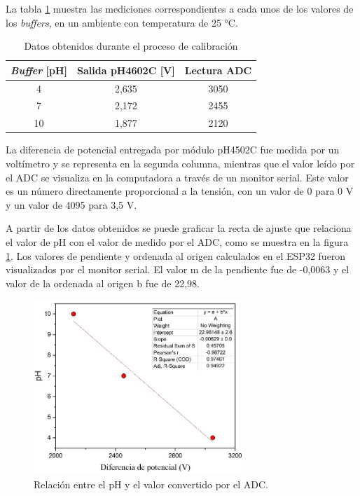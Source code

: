 La tabla \ref{tab:ensayoCalibracion} muestra las mediciones correspondientes a cada unos de los valores de los \textit{buffers}, en un ambiente con temperatura de 25 °C. 

\begin{table}[h]
	\centering
	\caption[Resultados calibración]{Datos obtenidos durante el proceso de calibración}
	\begin{tabular}{c c c }    
		\toprule
		\textbf{\textit{Buffer} [pH]} & \textbf{Salida pH4602C [V] }	&    \textbf{Lectura ADC}  \\
		\midrule
		4 	& 2,635 & 3050 \\		
		7	& 2,172 & 2455 \\
		10	& 1,877 & 2120 \\
		\bottomrule
		\hline
	\end{tabular}
	\label{tab:ensayoCalibracion}
\end{table}

La diferencia de potencial entregada por módulo pH4502C fue medida por un voltímetro y se representa en la segunda columna, mientras que el valor leído por el ADC se visualiza en la computadora a través de un monitor serial. Este valor es un número directamente proporcional a la tensión, con un valor de 0 para 0 V y un valor de 4095 para 3,5 V.

A partir de los datos obtenidos se puede graficar la recta de ajuste que relaciona el valor de pH con el valor de medido por el ADC, como se muestra en la figura \ref{fig:rectaADC}. Los valores de pendiente y ordenada al origen calculados en el ESP32 fueron visualizados por el monitor serial. El valor m de la pendiente fue de -0,0063 y el valor de la ordenada al origen b fue de 22,98. 

\begin{figure}[htbp]
	\centering
	\includegraphics[width=0.7\textwidth]{./Figures/rectaADC.jpg}
	\caption{Relación entre el pH y el valor convertido por el ADC.}
	\label{fig:rectaADC}
\end{figure}

